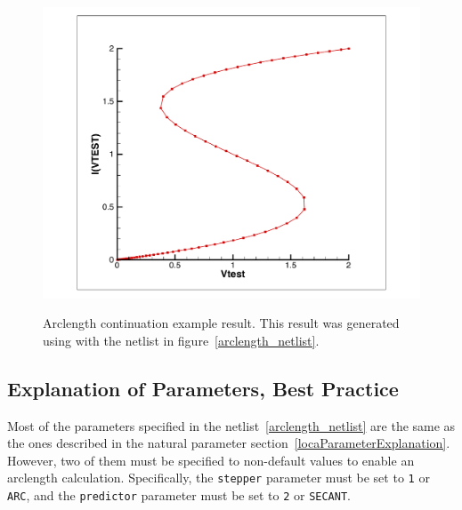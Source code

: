 \begin{figure}[ht]
  \centering
  \scalebox{0.7}
  {\includegraphics{arclengthSimple}}
  \caption [Arclength continuation example result. ]
  {Arclength continuation example result. This result was generated using \Xyce{} with the netlist in figure~\ref{arclength_netlist}.
\label{arclengthResult}
}
\end{figure}

\subsection{Explanation of Parameters, Best Practice}

Most of the parameters specified in the netlist~\ref{arclength_netlist} are 
the same as the ones described in the natural parameter 
section~\ref{locaParameterExplanation}.  However, two of them must be specified to non-default
values to enable an arclength calculation.   Specifically, the \texttt{stepper} 
parameter must be set to \texttt{1} or \texttt{ARC}, and the \texttt{predictor} 
parameter must be set to \texttt{2} or \texttt{SECANT}. 


